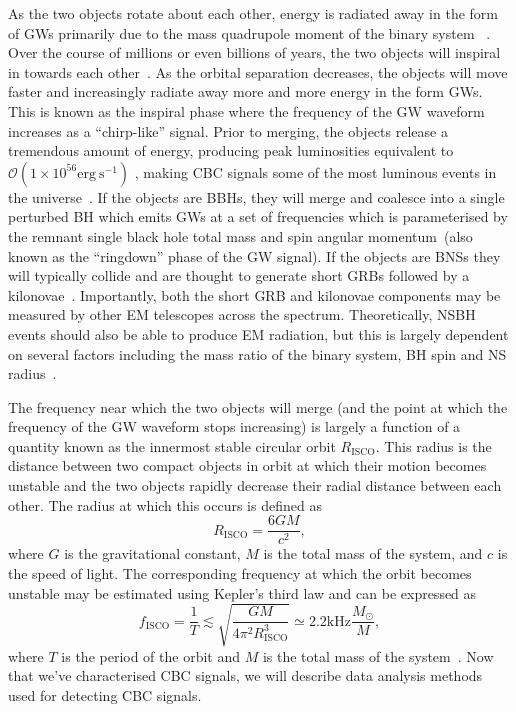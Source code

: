 As the two objects rotate about each other, energy is radiated away in the form of \ac{GW}s primarily due to the mass quadrupole moment of the binary system
~\cite{Maggiore:2007ulw}. 
Over the course of millions or even billions of years, the two objects will inspiral in towards each other~\cite{10.3389/fspas.2020.00038}. As the orbital separation decreases, the objects will move faster and increasingly
radiate away more and more energy in the form \ac{GW}s. This is known 
as the inspiral phase where the frequency of the \ac{GW} waveform 
increases as a ``chirp-like'' signal. Prior to merging, the objects release a tremendous amount of energy, producing 
peak luminosities equivalent to $\mathcal{O}(1 \times 10^{56}\mathrm{erg \ s^{-1}})$
, making \ac{CBC} signals some of the most luminous events in 
the universe~\cite{1811.12907,2010.14527}. 
If the objects are \ac{BBH}s, they 
will merge and coalesce into a single perturbed \ac{BH} which emits \ac{GW}s at 
a set of frequencies which is parameterised by the remnant single black 
hole total mass and spin angular momentum~\cite{Hawking1972,PhysRev.164.1776,
PhysRevLett.26.331}(also known as the 
``ringdown'' phase of the \ac{GW} signal). If the objects are \ac{BNS}s 
they will typically collide and are thought to generate short \ac{GRB}s followed by a kilonovae~\cite{2017arXiv171005834L}. Importantly, both the short 
\ac{GRB} and kilonovae components may be measured by other \ac{EM} telescopes across the spectrum. Theoretically, \ac{NSBH} events should also be able
to produce \ac{EM} radiation, but this is 
largely dependent on several factors including the mass ratio of the 
binary system, \ac{BH} spin and \ac{NS} radius~\cite{doi:10.1146/annurev-nucl-102115-044819}.

The frequency near which the two objects will merge (and the point 
at which the frequency of the \ac{GW} waveform stops increasing) is 
largely a function of a quantity known as the  
innermost stable circular orbit $R_{\mathrm{ISCO}}$. This radius is the distance between two compact objects in orbit at which their motion becomes unstable and the two objects rapidly decrease their radial distance between each other. The radius at which this occurs is defined as 
%
\begin{equation}
    R_{\mathrm{ISCO}} = \frac{6GM}{c^2},
\end{equation}
%
where $G$ is the gravitational constant, $M$ is the total mass of 
the system, and $c$ is the speed of light. The corresponding frequency at which the orbit becomes unstable may be estimated using Kepler's third law and can be expressed as 
%
\begin{equation}
    f_{\mathrm{ISCO}} = \frac{1}{T} \lesssim 
    \sqrt{\frac{GM}{4\pi^2R^3_{\mathrm{ISCO}}}} \simeq 2.2 \mathrm{kHz}\frac{M_\odot}{M} ,
\end{equation}
%
where $T$ is the period of the orbit and $M$ is the total mass of the system~\cite{Maggiore:2007ulw}. Now that we've characterised \ac{CBC} 
signals, we will describe data analysis methods used for detecting 
\ac{CBC} signals.



